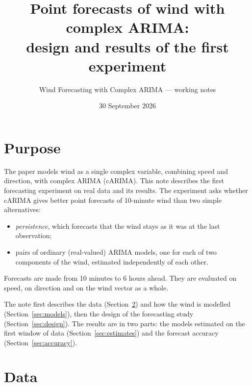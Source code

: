 \documentclass[11pt,a4paper]{article}
\title{Point forecasts of wind with complex ARIMA:\\ design and results of the first experiment}
\author{Wind Forecasting with Complex ARIMA --- working notes}
\date{30 September 2026}
\begin{document}
\maketitle

\section{Purpose}

The paper models wind as a single complex variable, combining speed and direction, with complex
ARIMA (cARIMA). This note describes the first forecasting experiment on real data and its results.
The experiment asks whether cARIMA gives better point forecasts of 10-minute wind than two
simple alternatives:
\begin{itemize}
  \item \emph{persistence}, which forecasts that the wind stays as it was at the last observation;
  \item pairs of ordinary (real-valued) ARIMA models, one for each of two components of the wind,
    estimated independently of each other.
\end{itemize}
Forecasts are made from 10 minutes to 6 hours ahead. They are evaluated on speed, on direction
and on the wind vector as a whole.

The note first describes the data (Section~\ref{sec:data}) and how the wind is modelled
(Section~\ref{sec:models}), then the design of the forecasting study
(Section~\ref{sec:design}). The results are in two parts: the models estimated on the first
window of data (Section~\ref{sec:estimates}) and the forecast accuracy
(Section~\ref{sec:accuracy}).

\section{Data}\label{sec:data}
\end{document}
